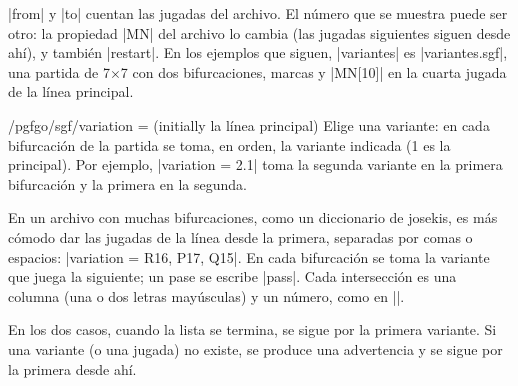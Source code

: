 |from| y |to| cuentan las jugadas del archivo. El número que se muestra puede ser otro: la propiedad |MN| del archivo lo cambia (las jugadas siguientes siguen desde ahí), y también |restart|. En los ejemplos que siguen, |variantes| es |variantes.sgf|, una partida de 7$\times$7 con dos bifurcaciones, marcas y |MN[10]| en la cuarta jugada de la línea principal.

\begin{key}{/pgfgo/sgf/variation =  (initially la línea principal)}
	Elige una variante: en cada bifurcación de la partida se toma, en orden, la variante indicada (1 es la principal). Por ejemplo, |variation = 2.1| toma la segunda variante en la primera bifurcación y la primera en la segunda.

	En un archivo con muchas bifurcaciones, como un diccionario de josekis, es más cómodo dar las jugadas de la línea desde la primera, separadas por comas o espacios: |variation = {R16, P17, Q15}|. En cada bifurcación se toma la variante que juega la siguiente; un pase se escribe |pass|. Cada intersección es una columna (una o dos letras mayúsculas) y un número, como en |\stone|.

	En los dos casos, cuando la lista se termina, se sigue por la primera variante. Si una variante (o una jugada) no existe, se produce una advertencia y se sigue por la primera desde ahí.

	\begin{codeexample}[]
		\begin{goban}[sgf size = variantes]
		\end{goban}

		\begin{goban}[sgf size = variantes]
		\end{goban}

		\begin{goban}[sgf size = variantes]
		\end{goban}
	\end{codeexample}
\end{key}

